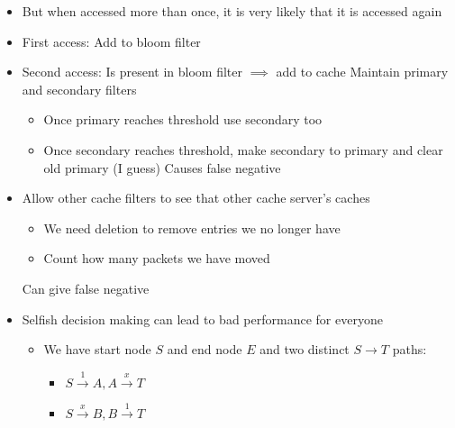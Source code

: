 \begin{itemize}
\begin{itemize}
\begin{itemize}
                    \item But when accessed more than once, it is very likely that it is accessed again
                    \item First access: Add to bloom filter
                    \item Second access: Is present in bloom filter $\implies$ add to cache
                     Maintain primary and secondary filters
                        \begin{itemize}
                            \item Once primary reaches threshold use secondary too
                            \item Once secondary reaches threshold, make secondary to primary and clear old primary (I guess)
                            \icon Causes false negative
                        \end{itemize}
                \end{itemize}
                \begin{itemize}
                    \item Allow other cache filters to see that other cache server's caches
                        \begin{itemize}
                            \item We need deletion to remove entries we no longer have
                            \item Count how many packets we have moved
                        \end{itemize}
                    \icon Can give false negative
                \end{itemize}
        \end{itemize}
        \begin{itemize}
            \item Selfish decision making can lead to bad performance for everyone
                \begin{itemize}
                    \item We have start node $S$ and end node $E$ and two distinct $S \to T$ paths:
                        \begin{itemize}
                            \item $S \overset{1}{\to} A, A \overset{x}{\to} T$
                            \item $S \overset{x}{\to} B, B \overset{1}{\to} T$

\end{itemize}
\end{itemize}
\end{itemize}
\end{itemize}
